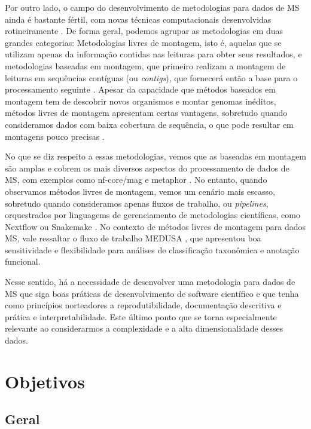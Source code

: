 \documentclass[
	12pt,				%
	oneside,			%
	a4paper,			%
	chapter=TITLE,		%
	section=TITLE,		%
	english,			%
	brazil				%
	]{abntex2}
\begin{document}
Por outro lado, o campo do desenvolvimento de metodologias para dados de \gls{MS} ainda é bastante fértil, com novas técnicas computacionais desenvolvidas rotineiramente \autocite{liu2021}. De forma geral, podemos agrupar as metodologias em duas grandes categorias: Metodologias livres de montagem, isto é, aquelas que se utilizam apenas da informação contidas nas leituras para obter seus resultados, e metodologias baseadas em montagem, que primeiro realizam a montagem de leituras em sequências contíguas (ou \textit{contigs}), que fornecerá então a base para o processamento seguinte \autocite{breitwieser2019}. Apesar da capacidade que métodos baseados em montagem tem de descobrir novos organismos e montar genomas inéditos, métodos livres de montagem apresentam certas vantagens, sobretudo quando consideramos dados com baixa cobertura de sequência, o que pode resultar em montagens pouco precisas \autocite{ayling2020}.

No que se diz respeito a essas metodologias, vemos que as baseadas em montagem são amplas e cobrem os mais diversos aspectos do processamento de dados de \gls{MS}, com exemplos como nf-core/mag \autocite{krakau2022} e metaphor \autocite{salazar2023}. No entanto, quando observamos métodos livres de montagem, vemos um cenário mais escasso, sobretudo quando consideramos apenas fluxos de trabalho, ou \emph{pipelines}, orquestrados por linguagems de gerenciamento de metodologias científicas, como Nextflow \autocite{ditommaso2017} ou Snakemake \autocite{mölder2021}. No contexto de métodos livres de montagem para dados \gls{MS}, vale ressaltar o fluxo de trabalho MEDUSA \autocite{morais2022}, que apresentou boa sensitividade e flexibilidade para análises de classificação taxonômica e anotação funcional.

Nesse sentido, há a necessidade de desenvolver uma metodologia para dados de \gls{MS} que siga boas práticas de desenvolvimento de software científico e que tenha como princípios norteadores a reprodutibilidade, documentação descritiva e prática e interpretabilidade. Este último ponto que se torna especialmente relevante ao considerarmos a complexidade e a alta dimensionalidade desses dados.

\chapter{Objetivos}\label{obj}

\section{Geral}\label{geral}
\end{document}
